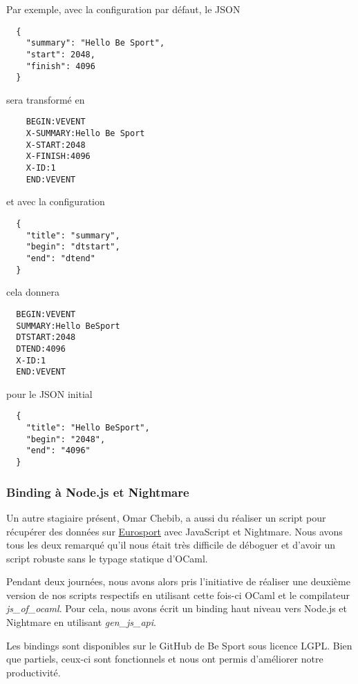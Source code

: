 Par exemple, avec la configuration par défaut, le JSON

\begin{lstlisting}
  {
    "summary": "Hello Be Sport",
    "start": 2048,
    "finish": 4096
  }
\end{lstlisting}

sera transformé en

\begin{lstlisting}
    BEGIN:VEVENT
    X-SUMMARY:Hello Be Sport
    X-START:2048
    X-FINISH:4096
    X-ID:1
    END:VEVENT
\end{lstlisting}

et avec la configuration

\begin{lstlisting}
  {
    "title": "summary",
    "begin": "dtstart",
    "end": "dtend"
  }
\end{lstlisting}

cela donnera

\begin{lstlisting}
  BEGIN:VEVENT
  SUMMARY:Hello BeSport
  DTSTART:2048
  DTEND:4096
  X-ID:1
  END:VEVENT
\end{lstlisting}

pour le JSON initial
\begin{lstlisting}
  {
    "title": "Hello BeSport",
    "begin": "2048",
    "end": "4096"
  }
\end{lstlisting}

\subsubsection*{Binding à Node.js et Nightmare}

Un autre stagiaire présent, Omar Chebib, a aussi du réaliser un script pour
récupérer des données sur \href{https://eurosport.com}{Eurosport} avec
JavaScript et Nightmare. Nous avons tous les deux remarqué qu'il nous était
très difficile de déboguer et d'avoir un script robuste sans le typage statique
d'OCaml.

Pendant deux journées, nous avons alors pris l'initiative de réaliser une deuxième version de
nos scripts respectifs en utilisant cette fois-ci OCaml et le compilateur
\emph{js\_of\_ocaml}. Pour cela,
nous avons écrit un binding haut niveau vers Node.js et Nightmare en utilisant
\emph{gen\_js\_api}\cite{gen-js-api-github}.

Les bindings\cite{besport-ocaml-node-github,
  besport-ocaml-node-nightmare-github} sont disponibles sur le GitHub de Be Sport sous licence
LGPL. Bien que partiels,
ceux-ci sont fonctionnels et nous ont permis d'améliorer notre productivité.

